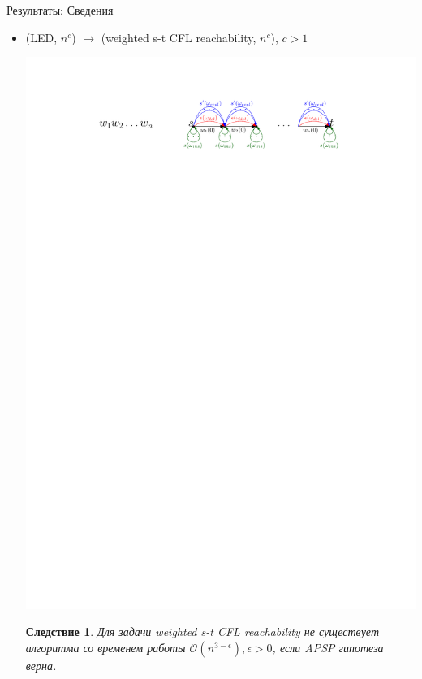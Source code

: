 \documentclass{beamer}
\newtheorem{cor}{Следствие}
\begin{document}
\begin{frame}{Результаты: Сведения}
	\begin{itemize}
		\item (LED, $n^{c}$) $\rightarrow$ (weighted s-t CFL reachability,  $n^{c}$), $c > 1$
		
		\begin{center}
			\includegraphics[scale=0.75]{./pictures/led_to_cflr.pdf}
		\end{center}
		
		\begin{cor}
			Для задачи weighted s-t CFL reachability не существует алгоритма со временем работы $\mathcal{O}(n^{3-\epsilon}), \epsilon > 0$, если APSP гипотеза верна.
		\end{cor}
	\end{itemize}
\end{frame}
	
\end{document}
